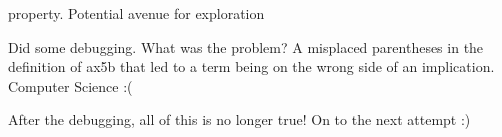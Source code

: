 \begin{isabellebody}
\begin{isamarkuptext}
property. Potential avenue for exploration%
\end{isamarkuptext}\isamarkuptrue%
%
\begin{isamarkuptext}%
Did some debugging. What was the problem? A misplaced parentheses in the definition 
of ax5b that led to a term being on the wrong side of an implication. Computer Science :(%
\end{isamarkuptext}\isamarkuptrue%
%
\begin{isamarkuptext}%
After the debugging, all of this is no longer true! On to the next attempt :)%
\end{isamarkuptext}\isamarkuptrue%
%
\isadelimtheory
%
\endisadelimtheory
%
\isatagtheory
{}\isamarkupfalse%
%
\endisatagtheory
{\isafoldtheory}%
%
\isadelimtheory
%
\endisadelimtheory
%
\end{isabellebody}%
\endinput
